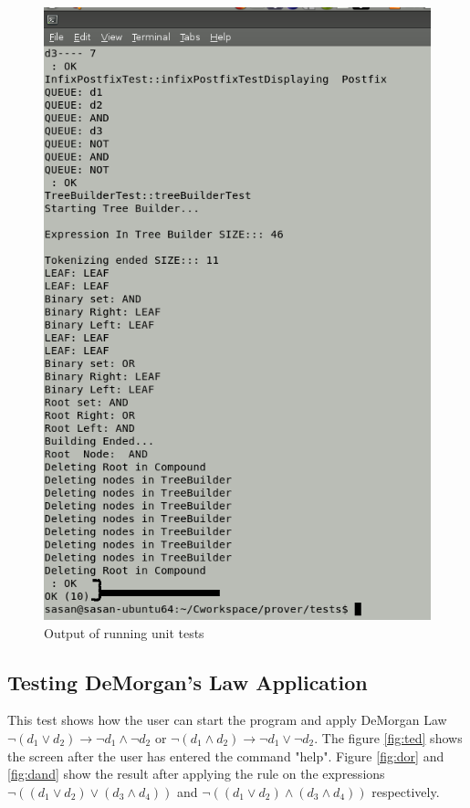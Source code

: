 \documentclass[10pt, a4paper, titlepage]{article}
\begin{document}
\begin{figure}[h]
\centering
\includegraphics[scale=0.4]{images/cpp.png}
\caption{Output of running unit tests}
\label{fig:cppunit}
\end{figure}

\subsection{Testing DeMorgan's Law Application}
This test shows how the user can start the program and apply DeMorgan Law $ \neg (d_{1} \vee d_{2}) \rightarrow \neg d_{1} \wedge \neg d_{2} $ or $ \neg (d_{1} \wedge d_{2}) \rightarrow \neg d_{1} \vee \neg d_{2} $. The figure \ref{fig:ted} shows the screen after the user has entered the command "help". Figure \ref{fig:dor} and \ref{fig:dand} show the result after applying the rule on the expressions $ \neg ( (d_{1} \vee d_{2}) \vee (d_{3} \wedge d_{4}) ) $  and  $ \neg ( (d_{1} \vee d_{2}) \wedge (d_{3} \wedge d_{4}) ) $ respectively.
\end{document}
